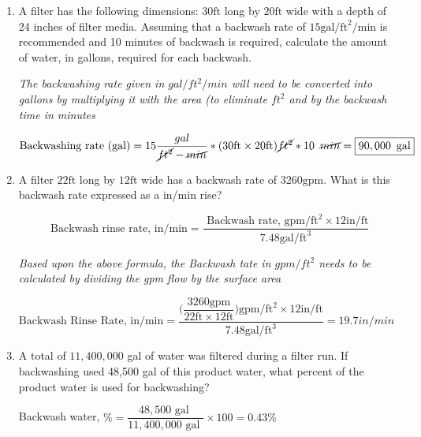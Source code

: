 \documentclass{article}
\begin{document}
\begin{enumerate}
\item A filter has the following dimensions: $30 \mathrm{ft}$ long by $20 \mathrm{ft}$ wide with a depth of 24 inches of filter media. Assuming that a backwash rate of $15 \mathrm{gal} / \mathrm{ft}^{2} / \mathrm{min}$ is recommended and 10 minutes of backwash is required, calculate the amount of water, in gallons, required for each backwash.

\textit{The backwashing rate given in $gal/ft^2/min$ will need to be converted into gallons by multiplying it with the area (to eliminate $ft^2$ and by the backwash time in minutes}

$ \text{Backwashing rate (gal)} = 15\dfrac{gal}{\cancel{ft^2}-\cancel{min}}*(30 \mathrm{ ft} \times 20 \mathrm{ ft})\cancel{ft^2}*10 \enspace \cancel{min}=\boxed{90,000 \enspace \text{gal}}$

\item A filter $22 \mathrm{ft}$ long by $12 \mathrm{ft}$ wide has a backwash rate of $3260 \mathrm{gpm}$. What is this backwash rate expressed as a in/min rise?

$$\text{ Backwash rinse rate, in/} \mathrm{min}=\frac{\text { Backwash rate, } \mathrm{gpm} / \mathrm{ft}^{2} \times 12 \mathrm{in} / \mathrm{ft}}{7.48 \mathrm{gal} / \mathrm{ft}^{3}}$$

\textit{Based upon the above formula, the Backwash tate in $gpm/ft^2$ needs to be calculated by dividing the gpm flow by the surface area}

$\text{Backwash Rinse Rate, in/} \mathrm{min}=\dfrac{
\Biggl(\dfrac{3260 \mathrm{gpm}}{22 \mathrm{ft} \times 12 \mathrm{ft}}\Biggr) \mathrm{gpm} / \mathrm{ft}^{2} \times 12 \mathrm{in} / \mathrm{ft}
}
{
7.48 \mathrm{gal} / \mathrm{ft}^{3}
}=\boxed{19.7in/min}$

\item A total of $11,400,000$ gal of water was filtered during a filter run. If backwashing used 48,500 gal of this product water, what percent of the product water is used for backwashing?

Backwash water, $\%=\dfrac{48,500 \text { gal }}{11,400,000 \text { gal }} \times 100 = \boxed{0.43 \%}$

\end{enumerate}
\end{document}
